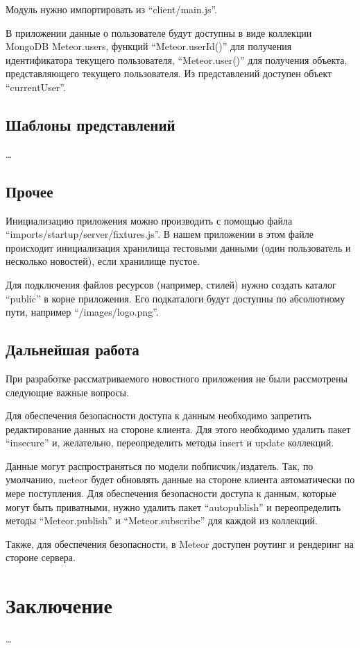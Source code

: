 \documentclass[a4paper,12pt]{article}
\begin{document}
Модуль нужно импортировать из ``client/main.js''.

В приложении данные о пользователе будут доступны
в виде коллекции MongoDB Meteor.users, функций
``Meteor.userId()'' для получения идентификатора
текущего пользователя, ``Meteor.user()'' для
получения объекта, представляющего текущего пользователя.
Из представлений доступен объект ``currentUser''. 

\subsection{Шаблоны представлений}
\dots

\subsection{Прочее}
Инициализацию приложения можно производить с помощью файла
``imports/startup/server/fixtures.js''. В нашем приложении
в этом файле происходит инициализация хранилища тестовыми данными
(один пользователь и несколько новостей), если хранилище
пустое.

Для подключения файлов ресурсов (например, стилей) нужно
создать каталог ``public'' в корне приложения. Его
подкаталоги будут доступны по абсолютному пути,
например ``/images/logo.png''.

\subsection{Дальнейшая работа}
При разработке рассматриваемого новостного приложения не были
рассмотрены следующие важные вопросы.

Для обеспечения безопасности доступа к данным необходимо
запретить редактирование данных на стороне клиента.
Для этого необходимо удалить пакет ``insecure''
и, желательно, переопределить методы insert и update
коллекций.

Данные могут распространяться по модели побписчик/издатель.
Так, по умолчанию, meteor будет обновлять данные
на стороне клиента автоматически по мере поступления.
Для обеспечения безопасности доступа к данным, 
которые могут быть приватными, нужно удалить пакет 
``autopublish'' и переопределить методы
``Meteor.publish'' и ``Meteor.subscribe'' для
каждой из коллекций.

Также, для обеспечения безопасности,
в Meteor доступен роутинг и рендеринг 
на стороне сервера.

\section*{Заключение}
\dots

\begin{thebibliography}{99}
	
\end{thebibliography}
\end{document}
